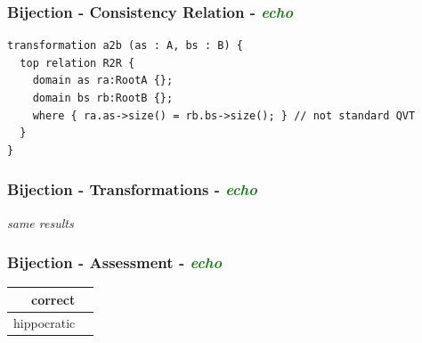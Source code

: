 \documentclass{beamer}
\newcommand{\cmark}{\ding{51}}%
\begin{document}
\begin{frame}[fragile]
\frametitle{Bijection - \textbf{Consistency Relation} - \textbf{\textit{\textcolor{green}{echo}}}}

\begin{lstlisting}[language=QVT]
transformation a2b (as : A, bs : B) {
  top relation R2R { 
    domain as ra:RootA {};
    domain bs rb:RootB {};
    where { ra.as->size() = rb.bs->size(); } // not standard QVT
  }
}
\end{lstlisting}

\end{frame}


\begin{frame}
\frametitle{Bijection - \textbf{Transformations} - \textbf{\textit{\textcolor{green}{echo}}}}

\begin{center}
\textit{same results}
\end{center}

\end{frame}


\begin{frame}
\frametitle{Bijection - \textbf{Assessment} - \textbf{\textit{\textcolor{green}{echo}}}}

\begin{center}
\begin{tabular}{| r | c |}
  \hline                        
  correct & \cmark\\
  \hline
  hippocratic & \cmark\\
  \hline 
\end{tabular}
\end{center}

\end{frame}

















\end{document}
